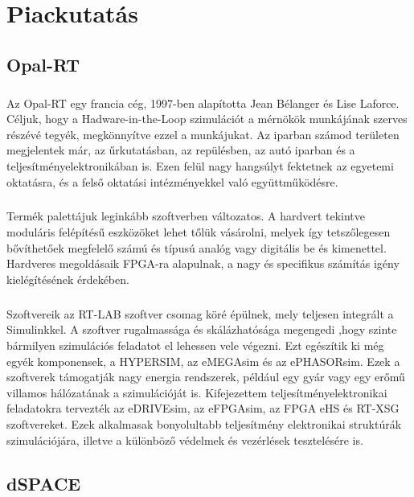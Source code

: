 \chapter{Piackutatás}
\section{Opal-RT \cite{opal}}

\paragraph{}
Az Opal-RT egy francia cég, 1997-ben alapította Jean Bélanger és Lise Laforce. Céljuk, hogy a Hadware-in-the-Loop szimulációt a mérnökök munkájának szerves részévé tegyék, megkönnyítve ezzel a munkájukat. Az iparban számod területen megjelentek már, az űrkutatásban, az repülésben, az autó iparban és a teljesítményelektronikában is. Ezen felül nagy hangsúlyt fektetnek az egyetemi oktatásra, és a felső oktatási intézményekkel való együttműködésre.

\paragraph{}
Termék palettájuk leginkább szoftverben változatos. A hardvert tekintve moduláris felépítésű eszközöket lehet tőlük vásárolni, melyek így tetszőlegesen bővíthetőek megfelelő számú és típusú analóg vagy digitális be és kimenettel. Hardveres megoldásaik FPGA-ra alapulnak, a nagy és specifikus számítás igény kielégítésének érdekében.

\paragraph{}
Szoftvereik az RT-LAB szoftver csomag köré épülnek, mely teljesen integrált a Simulinkkel. A szoftver rugalmassága és skálázhatósága megengedi ,hogy szinte bármilyen szimulációs feladatot el lehessen vele végezni. Ezt egészítik ki még egyék komponensek, a HYPERSIM, az eMEGAsim és az ePHASORsim. Ezek a szoftverek támogatják nagy energia rendszerek, például egy gyár vagy egy erőmű villamos hálózatának a szimulációját is. Kifejezettem teljesítményelektronikai feladatokra tervezték az eDRIVEsim, az eFPGAsim, az FPGA eHS és RT-XSG szoftvereket. Ezek alkalmasak bonyolultabb teljesítmény elektronikai struktúrák szimulációjára, illetve a különböző védelmek és vezérlések tesztelésére is.

\section{dSPACE \cite{dspace}}

